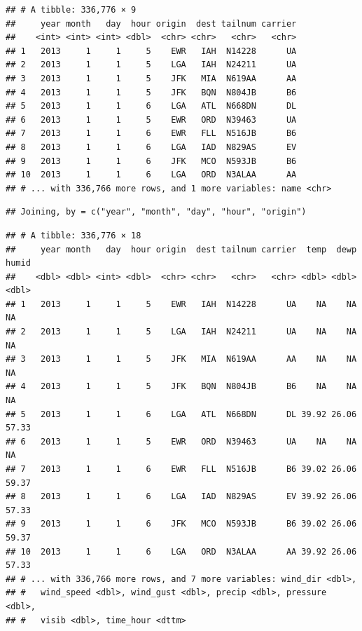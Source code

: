 \documentclass[]{book}
\newenvironment{Shaded}{\begin{snugshade}}{\end{snugshade}}
\newcommand{\KeywordTok}[1]{\textcolor[rgb]{0.13,0.29,0.53}{\textbf{{#1}}}}
\newcommand{\StringTok}[1]{\textcolor[rgb]{0.31,0.60,0.02}{{#1}}}
\newcommand{\NormalTok}[1]{{#1}}
\theoremstyle{definition}
\theoremstyle{definition}
\theoremstyle{remark}
\begin{document}
\begin{verbatim}
## # A tibble: 336,776 × 9
##     year month   day  hour origin  dest tailnum carrier
##    <int> <int> <int> <dbl>  <chr> <chr>   <chr>   <chr>
## 1   2013     1     1     5    EWR   IAH  N14228      UA
## 2   2013     1     1     5    LGA   IAH  N24211      UA
## 3   2013     1     1     5    JFK   MIA  N619AA      AA
## 4   2013     1     1     5    JFK   BQN  N804JB      B6
## 5   2013     1     1     6    LGA   ATL  N668DN      DL
## 6   2013     1     1     5    EWR   ORD  N39463      UA
## 7   2013     1     1     6    EWR   FLL  N516JB      B6
## 8   2013     1     1     6    LGA   IAD  N829AS      EV
## 9   2013     1     1     6    JFK   MCO  N593JB      B6
## 10  2013     1     1     6    LGA   ORD  N3ALAA      AA
## # ... with 336,766 more rows, and 1 more variables: name <chr>
\end{verbatim}

\begin{Shaded}
\end{Shaded}

\begin{verbatim}
## Joining, by = c("year", "month", "day", "hour", "origin")
\end{verbatim}

\begin{verbatim}
## # A tibble: 336,776 × 18
##     year month   day  hour origin  dest tailnum carrier  temp  dewp humid
##    <dbl> <dbl> <int> <dbl>  <chr> <chr>   <chr>   <chr> <dbl> <dbl> <dbl>
## 1   2013     1     1     5    EWR   IAH  N14228      UA    NA    NA    NA
## 2   2013     1     1     5    LGA   IAH  N24211      UA    NA    NA    NA
## 3   2013     1     1     5    JFK   MIA  N619AA      AA    NA    NA    NA
## 4   2013     1     1     5    JFK   BQN  N804JB      B6    NA    NA    NA
## 5   2013     1     1     6    LGA   ATL  N668DN      DL 39.92 26.06 57.33
## 6   2013     1     1     5    EWR   ORD  N39463      UA    NA    NA    NA
## 7   2013     1     1     6    EWR   FLL  N516JB      B6 39.02 26.06 59.37
## 8   2013     1     1     6    LGA   IAD  N829AS      EV 39.92 26.06 57.33
## 9   2013     1     1     6    JFK   MCO  N593JB      B6 39.02 26.06 59.37
## 10  2013     1     1     6    LGA   ORD  N3ALAA      AA 39.92 26.06 57.33
## # ... with 336,766 more rows, and 7 more variables: wind_dir <dbl>,
## #   wind_speed <dbl>, wind_gust <dbl>, precip <dbl>, pressure <dbl>,
## #   visib <dbl>, time_hour <dttm>
\end{verbatim}
\end{document}

